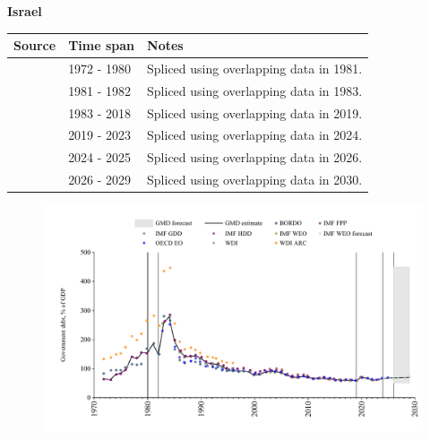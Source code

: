 \documentclass[12pt,a4paper,landscape]{article}
\begin{document}
\begin{adjustbox}{max totalsize={\paperwidth}{\paperheight},center}
\begin{minipage}[t][\textheight][t]{\textwidth}
\begin{figure}[H]
\end{figure}
\end{minipage}
\end{adjustbox}
\begin{adjustbox}{max totalsize={\paperwidth}{\paperheight},center}
\begin{minipage}[t][\textheight][t]{\textwidth}
\vspace*{0.5cm}
{}
\begin{center}
{\Large\bfseries Israel}
\end{center}
\vspace{0.5cm}
\begin{table}[H]
\centering
\small
\begin{tabular}{|l|l|l|}
\hline
\textbf{Source} & \textbf{Time span} & \textbf{Notes} \\
\hline
\rowcolor{white}\cite{IMF_FPP}& 1972 - 1980 &Spliced using overlapping data in 1981.\\
\rowcolor{lightgray}\cite{BORDO}& 1981 - 1982 &Spliced using overlapping data in 1983.\\
\rowcolor{white}\cite{IMF_GDD}& 1983 - 2018 &Spliced using overlapping data in 2019.\\
\rowcolor{lightgray}\cite{IMF_FPP}& 2019 - 2023 &Spliced using overlapping data in 2024.\\
\rowcolor{white}\cite{OECD_EO}& 2024 - 2025 &Spliced using overlapping data in 2026.\\
\rowcolor{lightgray}\cite{IMF_WEO_forecast}& 2026 - 2029 &Spliced using overlapping data in 2030.\\
\hline
\end{tabular}
\end{table}
\begin{figure}[H]
\centering
\includegraphics[width=\textwidth,height=0.6\textheight,keepaspectratio]{graphs/ISR_govdebt_GDP.pdf}
\end{figure}
\end{minipage}
\end{adjustbox}
\end{document}
